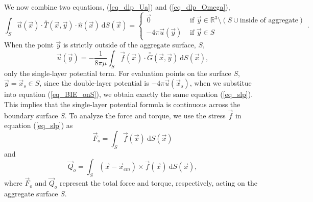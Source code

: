 We now combine two equations, (\ref{eq_dlp_Ua}) and (\ref{eq_dlp_Omega}),
\begin{equation}
	\int_S \vec{u} ( \vec{x}) \cdot \bar{\bar{T}}(\vec{x},\vec{y}) \cdot \hat{n} ( \vec{x})
	\ \text{d}S(\vec{x})
	 = 
	 \begin{cases}
	  \vec{0}& \text{ if } \vec{y} \in \mathbb{R}^3  \setminus \left( S \cup {\text{inside of aggregate}}\right)
	  \\ 
	 - 4\pi \vec{u}(\vec{y}) & \text{ if } \vec{y} \in S 
	 \end{cases}.
	\label{eq_dlp_val_out}
\end{equation}
When the point $\vec{y}$ is strictly outside of the aggregate surface, $S$,
 \begin{equation}
    \vec{u}(\vec{y}) = - \frac{1}{8 \pi \mu} \int_S  \vec{f}(\vec{x}) \cdot \bar{\bar{G}}(\vec{x},\vec{y}) \ \text{d}S(\vec{x}) ,
 \label{eq_slp}
 \end{equation}
 only the single-layer potential term.
For evaluation points on the surface $S$, 
$\vec{y} = \vec{x}_s \in S$, 
since the double-layer potential is $- 4 \pi \vec{u}(\vec{x}_s)$, when we substitue into equation (\ref{eq_BIE_onS}), 
we obtain exactly the same equation (\ref{eq_slp}). This implies that the single-layer potential formula is continuous across the boundary surface $S$.
To analyze the force and torque, we use the stress $\vec{f}$ in equation (\ref{eq_slp}) as
\begin{equation}
 \vec{F}_o
  = \int_S \vec{f}(\vec{x}) \  \text{d}S(\vec{x})
 \label{eq_total_Force_slp}
 \end{equation} 
 and
 \begin{equation}
 \vec{Q}_o  
 = \int_S (\vec{x} - \vec{x}_{cm}) \times \vec{f}(\vec{x})  \ \text{d}S (\vec{x})
 \label{eq_total_Torque_slp},
 \end{equation}
 where $\vec{F}_o$ and $\vec{Q}_o$ represent the total force and torque, respectively, acting on the aggregate surface $S$.
%

